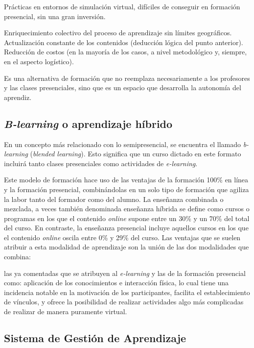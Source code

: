 Prácticas en entornos de simulación virtual, difíciles de conseguir en formación presencial, sin una gran inversión.

Enriquecimiento colectivo del proceso de aprendizaje sin límites geográficos.
Actualización constante de los contenidos (deducción lógica del punto anterior).
Reducción de costos (en la mayoría de los casos, a nivel metodológico y, siempre, en el aspecto logístico).

Es una alternativa de formación que no reemplaza necesariamente a los profesores y las clases presenciales, sino que es un espacio que desarrolla la autonomía del aprendiz.

\subsection{\emph{B-learning} o aprendizaje híbrido}

En un concepto más relacionado con lo semipresencial, se encuentra el llamado \emph{b-learning} (\emph{blended learning}). Esto significa que un curso dictado en este formato incluirá tanto clases presenciales como actividades de \emph{e-learning}\cite{bib:blearning}. 

Este modelo de formación hace uso de las ventajas de la formación 100\% en línea y la formación presencial, combinándolas en un solo tipo de formación que agiliza la labor tanto del formador como del alumno. La enseñanza combinada o mezclada, a veces también denominada enseñanza híbrida se define como cursos o programas en los que el contenido \emph{online} supone entre un 30\% y un 70\% del total del curso. En contraste, la enseñanza presencial incluye aquellos cursos en los que el contenido \emph{online} oscila entre 0\% y 29\% del curso. Las ventajas que se suelen atribuir a esta modalidad de aprendizaje son la unión de las dos modalidades que combina:

las ya comentadas que se atribuyen al \emph{e-learning} y las de la formación presencial como: aplicación de los conocimientos e interacción física, lo cual tiene una incidencia notable en la motivación de los participantes, facilita el establecimiento de vínculos, y ofrece la posibilidad de realizar actividades algo más complicadas de realizar de manera puramente virtual.

\subsection{Sistema de Gestión de Aprendizaje}

